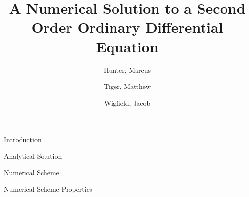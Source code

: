 \documentclass{article}
\title{
	{A Numerical Solution to a Second Order Ordinary Differential Equation}\\
}
\author{
	Hunter, Marcus \\
	\and
	Tiger, Matthew \\
	\and
	Wigfield, Jacob \\
}
\begin{document}
\maketitle
\newpage


\tableofcontents
\newpage


\begin{section}{Introduction}
  
\end{section}


\begin{section}{Analytical Solution}
  
\end{section}


\begin{section}{Numerical Scheme}\label{sec:scheme}
  
\end{section}


\begin{section}{Numerical Scheme Properties}\label{sec:scheme_prop}
  
\end{section}


%   
\end{document}
